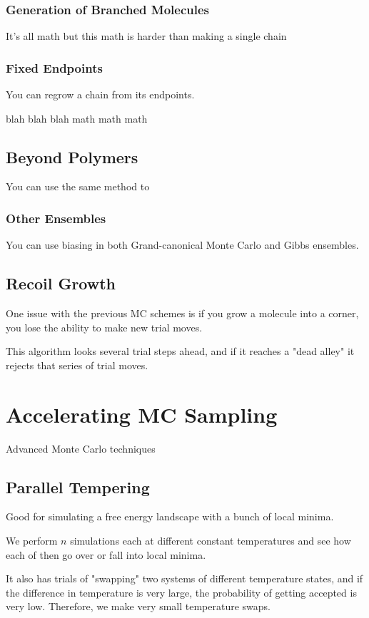 \documentclass[fleqn]{report}
\begin{document}
\subsection{Generation of Branched Molecules}
It's all math but this math is harder than making a single chain 

\subsection{Fixed Endpoints}
You can regrow a chain from its endpoints. 

blah blah blah math math math 

\section{Beyond Polymers}
You can use the same method to 

\subsection{Other Ensembles}
You can use biasing in both Grand-canonical Monte Carlo and Gibbs ensembles. 

\section{Recoil Growth}
One issue with the previous MC schemes is if you grow a molecule into a 
corner, you lose the ability to make new trial moves. 

This algorithm looks several trial steps ahead, and if it reaches a "dead 
alley" it rejects that series of trial moves. 

\chapter{Accelerating MC Sampling}
Advanced Monte Carlo techniques 

\section{Parallel Tempering}
Good for simulating a free energy landscape with a bunch of local minima. 

We perform $n$ simulations each at different constant temperatures and see 
how each of then go over or fall into local minima. 

It also has trials of "swapping" two systems of different temperature states, 
and if the difference in temperature is very large, the probability of 
getting accepted is very low. Therefore, we make very small temperature 
swaps. 
\end{document}
